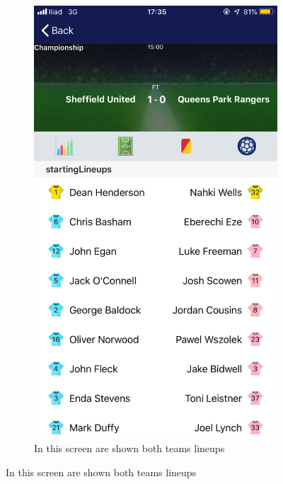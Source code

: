 \documentclass[numbers=noenddot, 12pt, a4paper, oneside]{scrbook}
\begin{document}
\begin{figure}[H]
\begin{subfigure}{.5\textwidth}
		\includegraphics[width=.8\linewidth]{images/Screen/Formazione}
		\caption{In this screen are shown both teams lineups}
	\end{subfigure}
\end{figure}
\end{document}
